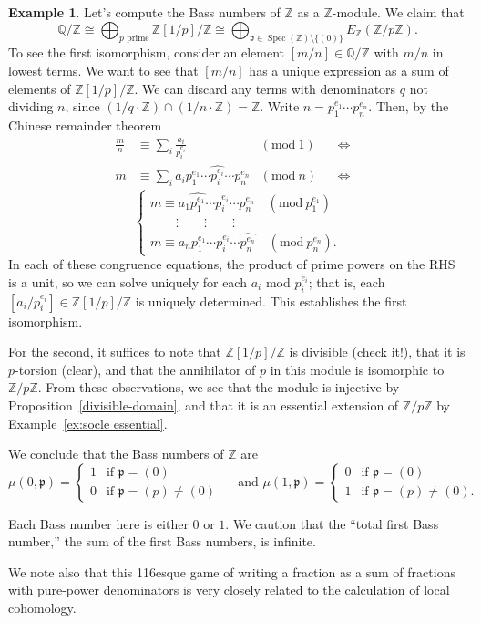\documentclass[11pt]{book}
\numberwithin{equation}{section}
\numberwithin{theorem}{chapter}
\theoremstyle{definition}
\newtheorem{example}[theorem]{Example}
\newtheorem*{basic properties}{Basic Properties}
\newtheorem*{Important Remark}{Important Remark}
\theoremstyle{remark}
\newcommand{\ZZ}{\mathbb{Z}}
\newcommand{\QQ}{\mathbb{Q}}
\newcommand{\p}{\mathfrak{p}}
\newcommand{\Spec}{\operatorname{Spec}}
\begin{document}
\begin{example}
	Let's compute the Bass numbers of $\ZZ$ as a $\ZZ$-module. We claim that \[\QQ/\ZZ\cong \bigoplus_{p \text{ prime}} \ZZ[1/p]/\ZZ \cong \bigoplus_{\p \in \Spec(\ZZ) \setminus \{(0)\}} E_{\ZZ}(\ZZ/p\ZZ).\]
	To see the first isomorphism, consider an element $[m/n]\in \QQ/\ZZ$ with $m/n$ in lowest terms. We want to see that $[m/n]$ has a unique expression as a sum of elements of $\ZZ[1/p]/\ZZ$. We can discard any terms with denominators $q$ not dividing $n$, since $(1/q \cdot\ZZ) \cap (1/n \cdot \ZZ) = \ZZ$. Write $n=p_1^{e_1}\cdots p_n^{e_n}$. Then, by the Chinese remainder theorem
	\begin{align*} \frac{m}{n} &\equiv \sum_i \frac{a_i}{p_i^{e_i}}&(\mathrm{mod} \ 1) & & \Longleftrightarrow & \\
		 m &\equiv \sum_i {a_i}{p_1^{e_1}\cdots \widehat{p_i^{e_i}} \cdots p_n^{e_n}} &(\mathrm{mod} \ n )&  &\Longleftrightarrow &
		 \end{align*}
		 \[\begin{cases} m \equiv {a_1}\widehat{p_1^{e_1}}\cdots {p_i^{e_i}} \cdots p_n^{e_n} \quad (\mathrm{mod} \ p_1^{e_1} ) \\
		\qquad  \vdots \qquad  \vdots \qquad  \vdots \\
		  m \equiv {a_n}p_1^{e_1}\cdots {p_i^{e_i}} \cdots \widehat{p_n^{e_n}} \quad (\mathrm{mod} \ p_n^{e_n} ).
		  \end{cases} \]
In each of these congruence equations, the product of prime powers on the RHS is a unit, so we can solve uniquely for each $a_i$ mod $p_i^{e_i}$; that is, each $[a_i / p_i^{e_i} ] \in \ZZ[1/p]/\ZZ$ is uniquely determined. This establishes the first isomorphism.
		  
		  For the second, it suffices to note that $\ZZ[1/p] / \ZZ$ is divisible (check it!), that it is $p$-torsion (clear), and that the annihilator of $p$ in this module is isomorphic to $\ZZ/ p \ZZ$. From these observations, we see that the module is injective by Proposition~\ref{divisible-domain}, and that it is an essential extension of $\ZZ / p \ZZ$ by Example~\ref{ex:socle essential}.
		  
		  We conclude that the Bass numbers of $\ZZ$ are 
		  \[\mu(0,\p)= \begin{cases} 1 \ \ \text{ if } \p=(0) \\ 0 \ \ \text{ if } \p=(p)\neq(0) \end{cases} \quad \text{ and } \mu(1,\p)= \begin{cases} 0 \ \ \text{ if } \p=(0) \\ 1 \ \ \text{ if } \p=(p)\neq(0). \end{cases} \]
		  
		  Each Bass number here is either $0$ or $1$. We caution that the ``total first Bass number,'' the sum of the first Bass numbers, is infinite.
		  
		  We note also that this 116esque game of writing a fraction as a sum of fractions with pure-power denominators is very closely related to the calculation of local cohomology.
	\end{example}
\end{document}
